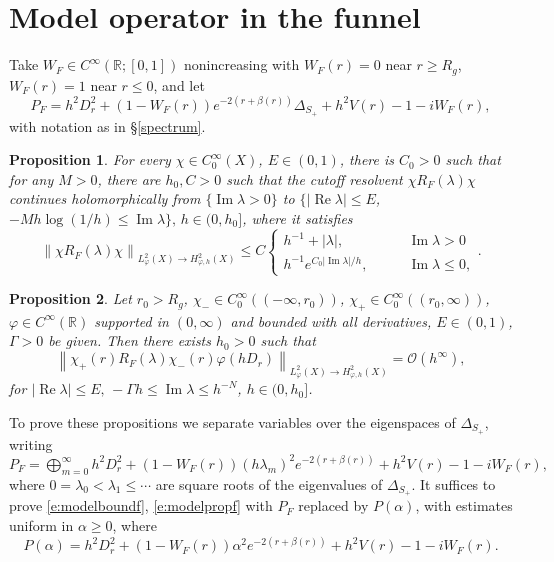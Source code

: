 \documentclass[reqno, 12pt]{amsart}
\newcommand \R {\mathbb{R}}
\newcommand \Oh {\mathcal{O}}
\DeclareMathOperator \re {Re}
\DeclareMathOperator \im {Im}
\newtheorem{prop}{Proposition}
\theoremstyle{definition}
\numberwithin{equation}{section}
\numberwithin{prop}{section}
\numberwithin{figure}{section}
\begin{document}
\section{Model operator in the funnel}\label{s:funnel}

Take $W_F \in C^\infty(\R;[0,1])$ nonincreasing with $W_F(r) = 0$ near $r \ge R_g$, $W_F(r) = 1$ near $r \le 0$, and let
\[
P_F = h^2D_r^2  + (1-W_F(r))e^{-2(r+\beta(r))} \Delta_{S_+} + h^2V(r) - 1 - iW_F(r),
\]
with notation as in \S\ref{spectrum}. 

\begin{prop} \label{p:modelboundf}
For every $\chi \in C_0^\infty(X)$, $E \in (0,1)$, there is $C_0>0$ such that for any $M>0$, there are $h_0,C>0$  such that the cutoff resolvent $\chi R_F(\lambda) \chi$ continues holomorphically from $\{\im \lambda>0\}$ to  $\{|\re \lambda| \le  E$, $-Mh\log(1/h) \le \im \lambda\}, \, h \in (0,h_0]$, where it satisfies
\begin{equation}\label{e:modelboundf}\left\|\chi R_F(\lambda) \chi\right\|_{L^2_\varphi(X) \to H^2_{\varphi,h} (X)} \le C \begin{cases}
h^{-1} + |\lambda|, \qquad & \im \lambda > 0 \\
h^{-1}e^{C_0 |\im \lambda|/h}, \qquad &\im \lambda \le 0,
\end{cases}. \end{equation}
\end{prop}

\begin{prop}\label{p:modelpropf}
Let $r_0 > R_g$, $\chi_- \in C_0^\infty((-\infty,r_0))$, $\chi_+ \in C_0^\infty((r_0,\infty))$, $\varphi \in C^\infty(\R)$ supported in $(0,\infty)$ and bounded with all derivatives, $E \in (0,1)$, $\Gamma>0$ be given. Then there exists $h_0>0$ such that
\begin{equation}\label{e:modelpropf}
\left\|\chi_+(r)R_F(\lambda)\chi_-(r)\varphi(hD_r)\right\|_{L^2_\varphi(X) \to H^2_{\varphi,h}(X)} = \Oh(h^\infty),
\end{equation}
 for $|\re \lambda| \le E, \, - \Gamma h \le \im \lambda \le h^{-N}$, $h \in (0,h_0]$.
\end{prop}

To prove these propositions we separate variables over the eigenspaces of $\Delta_{S_+}$, writing $P_F = \bigoplus_{m=0}^\infty  h^2D_r^2 +  (1-W_F(r))(h\lambda_m)^2 e^{-2(r + \beta(r))} + h^2 V(r) - 1 - iW_F(r),$ 
where $0 = \lambda_0 < \lambda_1  \le \cdots$ are square roots of the eigenvalues of $\Delta_{S_+}$. It suffices to prove \eqref{e:modelboundf}, \eqref{e:modelpropf} with $P_F$ replaced by $P(\alpha)$,  with estimates uniform in $\alpha \ge 0$, where
\[
P(\alpha) = h^2D_r^2 +  (1-W_F(r))\alpha^2e^{-2(r + \beta(r))} + h^2 V(r) - 1 - iW_F(r).
\]
\end{document}
